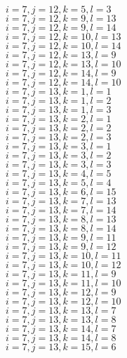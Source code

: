 \documentclass[14pt]{article}
\begin{document}
    $i=7,j=12,k=5,l=3 $ \\ 
    $i=7,j=12,k=9,l=13 $ \\ 
    $i=7,j=12,k=9,l=14 $ \\ 
    $i=7,j=12,k=10,l=13 $ \\ 
    $i=7,j=12,k=10,l=14 $ \\ 
    $i=7,j=12,k=13,l=9 $ \\ 
    $i=7,j=12,k=13,l=10 $ \\ 
    $i=7,j=12,k=14,l=9 $ \\ 
    $i=7,j=12,k=14,l=10 $ \\ 
    $i=7,j=13,k=1,l=1 $ \\ 
    $i=7,j=13,k=1,l=2 $ \\ 
    $i=7,j=13,k=1,l=3 $ \\ 
    $i=7,j=13,k=2,l=1 $ \\ 
    $i=7,j=13,k=2,l=2 $ \\ 
    $i=7,j=13,k=2,l=3 $ \\ 
    $i=7,j=13,k=3,l=1 $ \\ 
    $i=7,j=13,k=3,l=2 $ \\ 
    $i=7,j=13,k=3,l=3 $ \\ 
    $i=7,j=13,k=4,l=5 $ \\ 
    $i=7,j=13,k=5,l=4 $ \\ 
    $i=7,j=13,k=6,l=15 $ \\ 
    $i=7,j=13,k=7,l=13 $ \\ 
    $i=7,j=13,k=7,l=14 $ \\ 
    $i=7,j=13,k=8,l=13 $ \\ 
    $i=7,j=13,k=8,l=14 $ \\ 
    $i=7,j=13,k=9,l=11 $ \\ 
    $i=7,j=13,k=9,l=12 $ \\ 
    $i=7,j=13,k=10,l=11 $ \\ 
    $i=7,j=13,k=10,l=12 $ \\ 
    $i=7,j=13,k=11,l=9 $ \\ 
    $i=7,j=13,k=11,l=10 $ \\ 
    $i=7,j=13,k=12,l=9 $ \\ 
    $i=7,j=13,k=12,l=10 $ \\ 
    $i=7,j=13,k=13,l=7 $ \\ 
    $i=7,j=13,k=13,l=8 $ \\ 
    $i=7,j=13,k=14,l=7 $ \\ 
    $i=7,j=13,k=14,l=8 $ \\ 
    $i=7,j=13,k=15,l=6 $ \\ 
\end{document}
